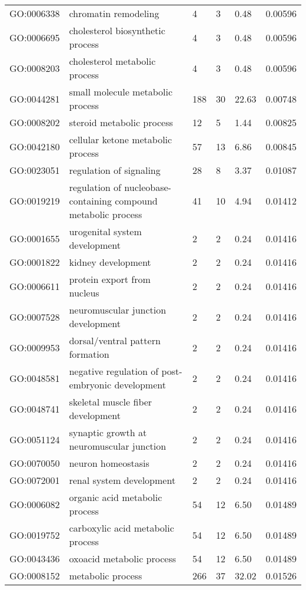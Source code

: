 \documentclass[10pt]{bmc_article}
\newenvironment{bmcformat}{\begin{raggedright}\baselineskip20pt\sloppy\setboolean{publ}{false}}{\end{raggedright}\baselineskip20pt\sloppy}
\begin{document}
\begin{bmcformat}
\begin{longtable}{lp{3cm}llll}
  GO:0006338 & chromatin remodeling &   4 &   3 & 0.48 & 0.00596 \\ 
  GO:0006695 & cholesterol biosynthetic process &   4 &   3 & 0.48 & 0.00596 \\ 
  GO:0008203 & cholesterol metabolic process &   4 &   3 & 0.48 & 0.00596 \\ 
  GO:0044281 & small molecule metabolic process & 188 &  30 & 22.63 & 0.00748 \\ 
  GO:0008202 & steroid metabolic process &  12 &   5 & 1.44 & 0.00825 \\ 
  GO:0042180 & cellular ketone metabolic process &  57 &  13 & 6.86 & 0.00845 \\ 
  GO:0023051 & regulation of signaling &  28 &   8 & 3.37 & 0.01087 \\ 
  GO:0019219 & regulation of nucleobase-containing compound metabolic process &  41 &  10 & 4.94 & 0.01412 \\ 
  GO:0001655 & urogenital system development &   2 &   2 & 0.24 & 0.01416 \\ 
  GO:0001822 & kidney development &   2 &   2 & 0.24 & 0.01416 \\ 
  GO:0006611 & protein export from nucleus &   2 &   2 & 0.24 & 0.01416 \\ 
  GO:0007528 & neuromuscular junction development &   2 &   2 & 0.24 & 0.01416 \\ 
  GO:0009953 & dorsal/ventral pattern formation &   2 &   2 & 0.24 & 0.01416 \\ 
  GO:0048581 & negative regulation of post-embryonic development &   2 &   2 & 0.24 & 0.01416 \\ 
  GO:0048741 & skeletal muscle fiber development &   2 &   2 & 0.24 & 0.01416 \\ 
  GO:0051124 & synaptic growth at neuromuscular junction &   2 &   2 & 0.24 & 0.01416 \\ 
  GO:0070050 & neuron homeostasis &   2 &   2 & 0.24 & 0.01416 \\ 
  GO:0072001 & renal system development &   2 &   2 & 0.24 & 0.01416 \\ 
  GO:0006082 & organic acid metabolic process &  54 &  12 & 6.50 & 0.01489 \\ 
  GO:0019752 & carboxylic acid metabolic process &  54 &  12 & 6.50 & 0.01489 \\ 
  GO:0043436 & oxoacid metabolic process &  54 &  12 & 6.50 & 0.01489 \\ 
  GO:0008152 & metabolic process & 266 &  37 & 32.02 & 0.01526 \\ 

\end{longtable}
\end{bmcformat}
\end{document}
